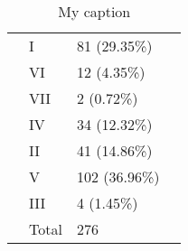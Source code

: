 \begin{table}[]
{\begin{tabular}{|l|l|l|l}
 & I & 81 (29.35\%) &  \\ \cline{2-3}
 & VI & 12 (4.35\%) &  \\ \cline{2-3}
 & VII & 2 (0.72\%) &  \\ \cline{2-3}
 & IV & 34 (12.32\%) &  \\ \cline{2-3}
 & II & 41 (14.86\%) &  \\ \cline{2-3}
 & V & 102 (36.96\%) &  \\ \cline{2-3}
 & III & 4 (1.45\%) &  \\ \cline{2-3}
 & Total & 276 &  \\ \cline{1-3}
\end{tabular}
}
\caption{My caption}
\label{my-label}
\end{table}

\newpage
